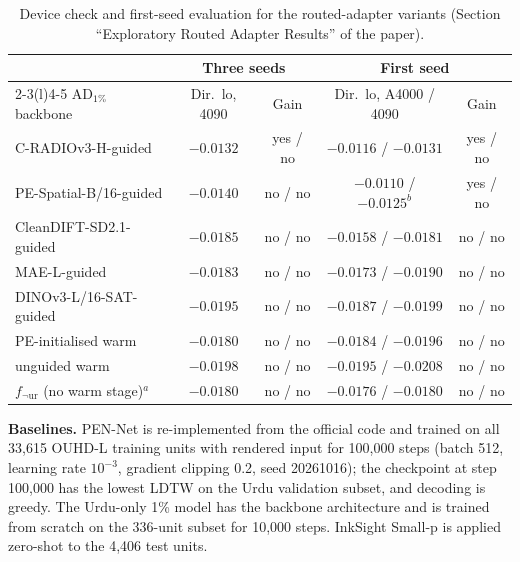 \documentclass[10pt,a4paper]{article}
\newcommand{\botrule}{\bottomrule}
\newcommand{\fnot}[1]{f_{\neg\mathrm{#1}}}
\newcommand{\AD}[1]{\mathrm{AD}_{#1}}
\begin{document}
\begin{table}[!htbp]
\centering
\caption{Device check and first-seed evaluation for the routed-adapter variants (Section ``Exploratory Routed Adapter Results'' of the paper).}\label{tabS:singleapp}
\scriptsize\setlength{\tabcolsep}{6pt}
\begin{tabular}{@{}lcccc@{}}
\toprule
 & \multicolumn{2}{c}{Three seeds} & \multicolumn{2}{c}{First seed}\\
\cmidrule(lr){2-3}\cmidrule(l){4-5}
$\AD{1\%}$ backbone & Dir.\ lo, 4090 & Gain & Dir.\ lo, A4000 / 4090 & Gain\\
\midrule
C-RADIOv3-H-guided & $-0.0132$ & yes / no & $-0.0116$ / $-0.0131$ & yes / no\\
PE-Spatial-B/16-guided & $-0.0140$ & no / no & $-0.0110$ / $-0.0125^{b}$ & yes / no\\
CleanDIFT-SD2.1-guided & $-0.0185$ & no / no & $-0.0158$ / $-0.0181$ & no / no\\
MAE-L-guided & $-0.0183$ & no / no & $-0.0173$ / $-0.0190$ & no / no\\
DINOv3-L/16-SAT-guided & $-0.0195$ & no / no & $-0.0187$ / $-0.0199$ & no / no\\
PE-initialised warm & $-0.0180$ & no / no & $-0.0184$ / $-0.0196$ & no / no\\
unguided warm & $-0.0198$ & no / no & $-0.0195$ / $-0.0208$ & no / no\\
$\fnot{ur}$ (no warm stage)$^{a}$ & $-0.0180$ & no / no & $-0.0176$ / $-0.0180$ & no / no\\
\botrule
\end{tabular}
\par{}
\end{table}


\textbf{Baselines.} PEN-Net is re-implemented from the official code and trained on all 33,615 OUHD-L training units with rendered input for 100,000 steps (batch 512, learning rate $10^{-3}$, gradient clipping 0.2, seed 20261016); the checkpoint at step 100,000 has the lowest LDTW on the Urdu validation subset, and decoding is greedy. The Urdu-only 1\% model has the backbone architecture and is trained from scratch on the 336-unit subset for 10,000 steps. InkSight Small-p is applied zero-shot to the 4,406 test units.
\end{document}
